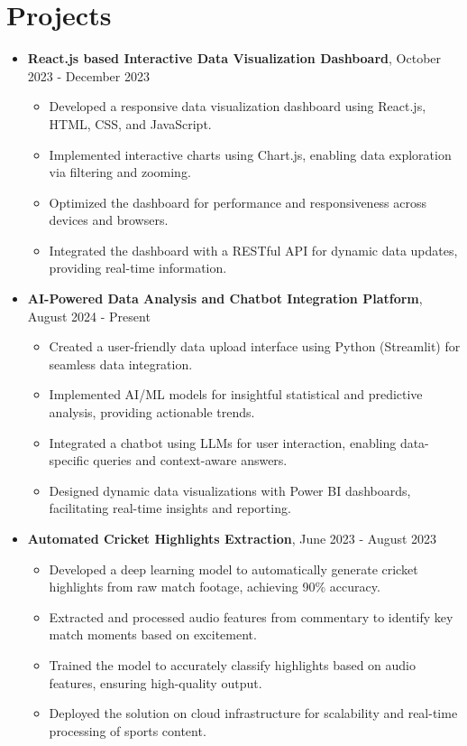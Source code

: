 \documentclass{article}
\begin{document}
    \section{Projects}
    \begin{itemize}[noitemsep, topsep=0pt]
        \item \textbf{React.js based Interactive Data Visualization Dashboard}, October 2023 - December 2023
            \begin{itemize}[noitemsep, topsep=0pt]
                \item Developed a responsive data visualization dashboard using React.js, HTML, CSS, and JavaScript.
                \item Implemented interactive charts using Chart.js, enabling data exploration via filtering and zooming.
                \item Optimized the dashboard for performance and responsiveness across devices and browsers.
                \item Integrated the dashboard with a RESTful API for dynamic data updates, providing real-time information.
            \end{itemize}
        \item \textbf{AI-Powered Data Analysis and Chatbot Integration Platform}, August 2024 - Present
            \begin{itemize}[noitemsep, topsep=0pt]
                \item Created a user-friendly data upload interface using Python (Streamlit) for seamless data integration.
                \item Implemented AI/ML models for insightful statistical and predictive analysis, providing actionable trends.
                \item Integrated a chatbot using LLMs for user interaction, enabling data-specific queries and context-aware answers.
                \item Designed dynamic data visualizations with Power BI dashboards, facilitating real-time insights and reporting.
            \end{itemize}
        \item \textbf{Automated Cricket Highlights Extraction}, June 2023 - August 2023
            \begin{itemize}[noitemsep, topsep=0pt]
                \item Developed a deep learning model to automatically generate cricket highlights from raw match footage, achieving 90\% accuracy.
                \item Extracted and processed audio features from commentary to identify key match moments based on excitement.
                \item Trained the model to accurately classify highlights based on audio features, ensuring high-quality output.
                \item Deployed the solution on cloud infrastructure for scalability and real-time processing of sports content.
            \end{itemize}
    \end{itemize}
    \vspace{1cm}
\end{document}
